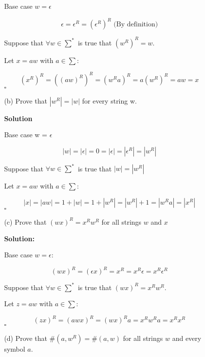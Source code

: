 \documentclass[9pt,tikz,border=2mm]{article}
\begin{document}
\begin{enumerate}
\begin{enumerate}
\begin{enumerate}
                Base case $w=\epsilon$

                \[
                    \epsilon = \epsilon^R = (\epsilon^R)^R \text{  (By definition)}
                \]

                Suppose that $\forall w \in \sum^*$ is true that $(w^R)^R = w$.\newline

                Let $x = aw$ with $a \in \sum$:

                \[ 
                    (x^R)^R = ((aw)^R)^R = (w^Ra)^R = a(w^R)^R = aw = x
                \]
                $\square$\newline

                \item[(b)] Prove that $|w^R|=|w|$ for every string w. 
                
                \textbf{Solution}

                Base case w = $\epsilon$

                    \[|w| = |\epsilon| = 0 = |\epsilon| = |\epsilon^R| = |w^R|\]\newline

                Suppose that $\forall w \in \sum^*$ is true that $|w| = |w^R|$\newline

                Let $x=aw$ with $a \in \sum$:

                \[|x| = |aw| = 1 + |w| = 1 + |w^R| = |w^R| + 1 = |w^Ra| = |x^R|\]$\square$\newline

                \item[(c)] Prove that  $(wx)^R = x^Rw^R$ for all strings $w$ and $x$
                
                \textbf{Solution:}

                Base case $w=\epsilon$: 

                \[(wx)^R = (\epsilon x)^R = x^R = x^R\epsilon = x^R\epsilon^R\]

                Suppose that $\forall w \in \sum^*$ is true that $(wx)^R = x^Rw^R$.\newline

                Let $z=aw$ with $a \in \sum$:

                \[ (zx)^R = (awx)^R = (wx)^Ra = x^Rw^Ra = x^Rx^R\]$\square$\newline

                \item[(d)] Prove that  $\#(a,w^R) = \#(a,w)$ for all strings $w$ and every symbol $a$.
                

\end{enumerate}
\end{enumerate}
\end{enumerate}
\end{document}
